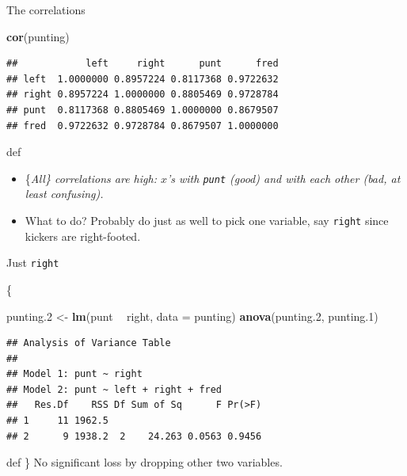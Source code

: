 \documentclass[ignorenonframetext,]{beamer}
\newenvironment{Shaded}{\begin{snugshade}}{\end{snugshade}}
\newcommand{\DataTypeTok}[1]{\textcolor[rgb]{0.13,0.29,0.53}{#1}}
\newcommand{\FloatTok}[1]{\textcolor[rgb]{0.00,0.00,0.81}{#1}}
\newcommand{\KeywordTok}[1]{\textcolor[rgb]{0.13,0.29,0.53}{\textbf{#1}}}
\newcommand{\NormalTok}[1]{#1}
\newcommand{\OperatorTok}[1]{\textcolor[rgb]{0.81,0.36,0.00}{\textbf{#1}}}
\newcommand{\StringTok}[1]{\textcolor[rgb]{0.31,0.60,0.02}{#1}}
\begin{document}
\begin{frame}[fragile]{The correlations}
\protect\hypertarget{the-correlations}{}

\begin{Shaded}
\begin{Highlighting}[]
\KeywordTok{cor}\NormalTok{(punting)}
\end{Highlighting}
\end{Shaded}

\begin{verbatim}
##            left     right      punt      fred
## left  1.0000000 0.8957224 0.8117368 0.9722632
## right 0.8957224 1.0000000 0.8805469 0.9728784
## punt  0.8117368 0.8805469 1.0000000 0.8679507
## fred  0.9722632 0.9728784 0.8679507 1.0000000
\end{verbatim}

def

\begin{itemize}
\item
  \{\em All\} correlations are high: \(x\)'s with \texttt{punt} (good)
  and with each other (bad, at least confusing).
\item
  What to do? Probably do just as well to pick one variable, say
  \texttt{right} since kickers are right-footed.
\end{itemize}

\end{frame}

\begin{frame}[fragile]{Just \texttt{right}}
\protect\hypertarget{just-right}{}

\{\small

\begin{Shaded}
\begin{Highlighting}[]
\NormalTok{punting}\FloatTok{.2}\NormalTok{ <-}\StringTok{ }\KeywordTok{lm}\NormalTok{(punt }\OperatorTok{~}\StringTok{ }\NormalTok{right, }\DataTypeTok{data =}\NormalTok{ punting)}
\KeywordTok{anova}\NormalTok{(punting}\FloatTok{.2}\NormalTok{, punting}\FloatTok{.1}\NormalTok{)}
\end{Highlighting}
\end{Shaded}

\begin{verbatim}
## Analysis of Variance Table
## 
## Model 1: punt ~ right
## Model 2: punt ~ left + right + fred
##   Res.Df    RSS Df Sum of Sq      F Pr(>F)
## 1     11 1962.5                           
## 2      9 1938.2  2    24.263 0.0563 0.9456
\end{verbatim}

def \} No significant loss by dropping other two variables.

\end{frame}
\end{document}

